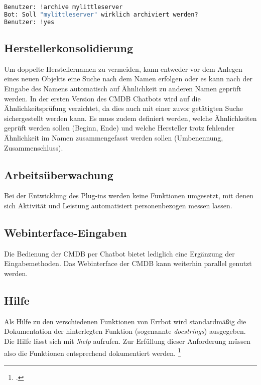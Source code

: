 \begin{lstlisting}[language=python, label=delconfirm, caption=Nachfrage bei der Archivierung von Objekten]
Benutzer: !archive mylittleserver
Bot: Soll "mylittleserver" wirklich archiviert werden?
Benutzer: !yes
\end{lstlisting}

\subsection{Herstellerkonsolidierung}
Um doppelte Herstellernamen zu vermeiden, kann entweder vor dem Anlegen eines neuen Objekts eine Suche nach dem Namen erfolgen oder es kann nach der Eingabe des Namens automatisch auf Ähnlichkeit zu anderen Namen geprüft werden.
In der ersten Version des \acs{CMDB} Chatbots wird auf die Ähnlichkeitsprüfung verzichtet, da dies auch mit einer zuvor getätigten Suche sichergestellt werden kann. Es muss zudem definiert werden, welche Ähnlichkeiten geprüft werden sollen (Beginn, Ende) und welche Hersteller trotz fehlender Ähnlichkeit im Namen zusammengefasst werden sollen (Umbenennung, Zusammenschluss).

\subsection{Arbeitsüberwachung}
Bei der Entwicklung des Plug-ins werden keine Funktionen umgesetzt, mit denen sich Aktivität und Leistung automatisiert personenbezogen messen lassen. 

\subsection{Webinterface-Eingaben}
Die Bedienung der \acs{CMDB} per Chatbot bietet lediglich eine Ergänzung der Eingabemethoden. Das Webinterface der \acs{CMDB} kann weiterhin parallel genutzt werden.

\subsection{Hilfe}
Als Hilfe zu den verschiedenen Funktionen von Errbot wird standardmäßig die Dokumentation der hinterlegten Funktion (sogenannte \textit{docstrings}) ausgegeben. Die Hilfe lässt sich mit \textit{!help} aufrufen. Zur Erfüllung dieser Anforderung müssen also die Funktionen entsprechend dokumentiert werden.
\footcites[Vgl.][o. \pno]{errbot_2018_general}[Vgl.][o. \pno]{pep257}

